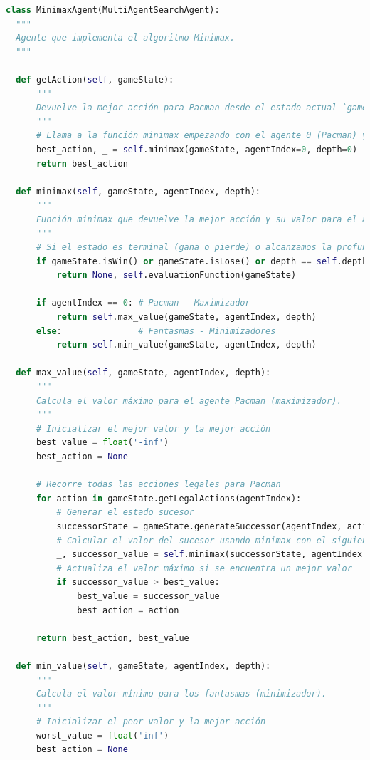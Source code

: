 \documentclass{report}
\begin{document}
          \begin{lstlisting}[language=Python, caption=Implementación final del agente Minimax]
class MinimaxAgent(MultiAgentSearchAgent):
  """
  Agente que implementa el algoritmo Minimax.
  """

  def getAction(self, gameState):
      """
      Devuelve la mejor acción para Pacman desde el estado actual `gameState` usando Minimax.
      """
      # Llama a la función minimax empezando con el agente 0 (Pacman) y profundidad 0
      best_action, _ = self.minimax(gameState, agentIndex=0, depth=0)
      return best_action

  def minimax(self, gameState, agentIndex, depth):
      """
      Función minimax que devuelve la mejor acción y su valor para el agente actual.
      """
      # Si el estado es terminal (gana o pierde) o alcanzamos la profundidad máxima, evaluamos el estado
      if gameState.isWin() or gameState.isLose() or depth == self.depth:
          return None, self.evaluationFunction(gameState)

      if agentIndex == 0: # Pacman - Maximizador
          return self.max_value(gameState, agentIndex, depth)
      else:               # Fantasmas - Minimizadores
          return self.min_value(gameState, agentIndex, depth)

  def max_value(self, gameState, agentIndex, depth):
      """
      Calcula el valor máximo para el agente Pacman (maximizador).
      """
      # Inicializar el mejor valor y la mejor acción
      best_value = float('-inf')
      best_action = None

      # Recorre todas las acciones legales para Pacman
      for action in gameState.getLegalActions(agentIndex):
          # Generar el estado sucesor
          successorState = gameState.generateSuccessor(agentIndex, action)
          # Calcular el valor del sucesor usando minimax con el siguiente agente
          _, successor_value = self.minimax(successorState, agentIndex + 1, depth)
          # Actualiza el valor máximo si se encuentra un mejor valor
          if successor_value > best_value:
              best_value = successor_value
              best_action = action

      return best_action, best_value

  def min_value(self, gameState, agentIndex, depth):
      """
      Calcula el valor mínimo para los fantasmas (minimizador).
      """
      # Inicializar el peor valor y la mejor acción
      worst_value = float('inf')
      best_action = None


\end{lstlisting}
\end{document}
